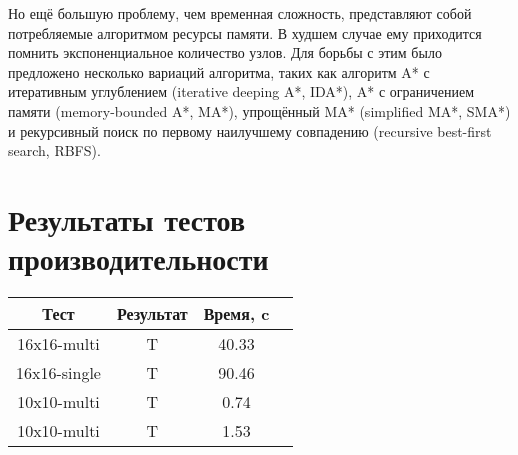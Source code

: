 Но ещё большую проблему, чем временная сложность, представляют собой
потребляемые алгоритмом ресурсы памяти. В худшем случае ему приходится
помнить экспоненциальное количество узлов. Для борьбы с этим было
предложено несколько вариаций алгоритма, таких как алгоритм A* с
итеративным углублением (iterative deeping A*, IDA*), A* с
ограничением памяти (memory-bounded A*, MA*), упрощённый MA*
(simplified MA*, SMA*) и рекурсивный поиск по первому наилучшему
совпадению (recursive best-first search, RBFS).

\section{Результаты тестов производительности}
\begin{center}
  \begin{tabular}{|c|c|c|c|}
    \hline

    Тест & Результат & Время, c \\
    \hline
    
    16x16-multi & T & 40.33 \\
    16x16-single & T & 90.46 \\
    10x10-multi & T & 0.74 \\
    10x10-multi & T & 1.53 \\

    \hline
  \end{tabular}
\end{center}


